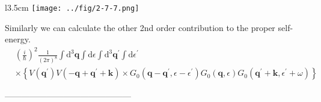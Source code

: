\begin{wrapfigure}[4]{l}{3.5cm}
\label{Fig2.7.7} \texttt{[image: ../fig/2-7-7.png]}
\end{wrapfigure}
Similarly we can calculate the other 2nd order contribution to the proper self-energy.
\[ \begin{split} & \left(\frac{i}{\hbar}\right)^2 \frac{1}{(2\pi)^8} \int \mathrm{d}^3 \mathbf{q} \int \mathrm{d} \epsilon \int \mathrm{d}^3 \mathbf{q}^{'} \int \mathrm{d} \epsilon^{'}  \\
& \times \left\{ V(\mathbf{q}^{'})V(-\mathbf{q} + \mathbf{q}^{'}+\mathbf{k})
\times G_0(\mathbf{q}-\mathbf{q}^{'},\epsilon-\epsilon^{'})G_0(\mathbf{q},\epsilon)G_0(\mathbf{q}^{'}+\mathbf{k},\epsilon^{'}+\omega) \right\} \end{split}\]
\begin{center}---------------------------------------------\end{center}
